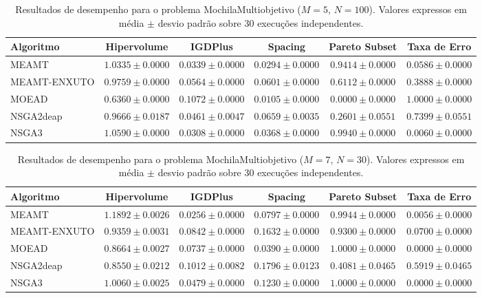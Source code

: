 \begin{table}[htpb]
\centering
\caption{Resultados de desempenho para o problema MochilaMultiobjetivo ($M=5$, $N=100$). Valores expressos em média $\pm$ desvio padrão sobre 30 execuções independentes.}
\label{tab:MochilaMultiobjetivo_M5_N100}
\begin{tabular}{lccccc}
\hline\hline
Algoritmo & Hipervolume & IGDPlus & Spacing & Pareto Subset & Taxa de Erro \\
\hline
MEAMT & $1.0335 \pm 0.0000$ & $0.0339 \pm 0.0000$ & $0.0294 \pm 0.0000$ & $0.9414 \pm 0.0000$ & $0.0586 \pm 0.0000$ \\
MEAMT-ENXUTO & $0.9759 \pm 0.0000$ & $0.0564 \pm 0.0000$ & $0.0601 \pm 0.0000$ & $0.6112 \pm 0.0000$ & $0.3888 \pm 0.0000$ \\
MOEAD & $0.6360 \pm 0.0000$ & $0.1072 \pm 0.0000$ & $0.0105 \pm 0.0000$ & $0.0000 \pm 0.0000$ & $1.0000 \pm 0.0000$ \\
NSGA2deap & $0.9666 \pm 0.0187$ & $0.0461 \pm 0.0047$ & $0.0659 \pm 0.0035$ & $0.2601 \pm 0.0551$ & $0.7399 \pm 0.0551$ \\
NSGA3 & $1.0590 \pm 0.0000$ & $0.0308 \pm 0.0000$ & $0.0368 \pm 0.0000$ & $0.9940 \pm 0.0000$ & $0.0060 \pm 0.0000$ \\
\hline\hline
\end{tabular}
\end{table}

\begin{table}[htpb]
\centering
\caption{Resultados de desempenho para o problema MochilaMultiobjetivo ($M=7$, $N=30$). Valores expressos em média $\pm$ desvio padrão sobre 30 execuções independentes.}
\label{tab:MochilaMultiobjetivo_M7_N30}
\begin{tabular}{lccccc}
\hline\hline
Algoritmo & Hipervolume & IGDPlus & Spacing & Pareto Subset & Taxa de Erro \\
\hline
MEAMT & $1.1892 \pm 0.0026$ & $0.0256 \pm 0.0000$ & $0.0797 \pm 0.0000$ & $0.9944 \pm 0.0000$ & $0.0056 \pm 0.0000$ \\
MEAMT-ENXUTO & $0.9359 \pm 0.0031$ & $0.0842 \pm 0.0000$ & $0.1632 \pm 0.0000$ & $0.9300 \pm 0.0000$ & $0.0700 \pm 0.0000$ \\
MOEAD & $0.8664 \pm 0.0027$ & $0.0737 \pm 0.0000$ & $0.0390 \pm 0.0000$ & $1.0000 \pm 0.0000$ & $0.0000 \pm 0.0000$ \\
NSGA2deap & $0.8550 \pm 0.0212$ & $0.1012 \pm 0.0082$ & $0.1796 \pm 0.0123$ & $0.4081 \pm 0.0465$ & $0.5919 \pm 0.0465$ \\
NSGA3 & $1.0060 \pm 0.0025$ & $0.0479 \pm 0.0000$ & $0.1230 \pm 0.0000$ & $1.0000 \pm 0.0000$ & $0.0000 \pm 0.0000$ \\
\hline\hline
\end{tabular}
\end{table}

